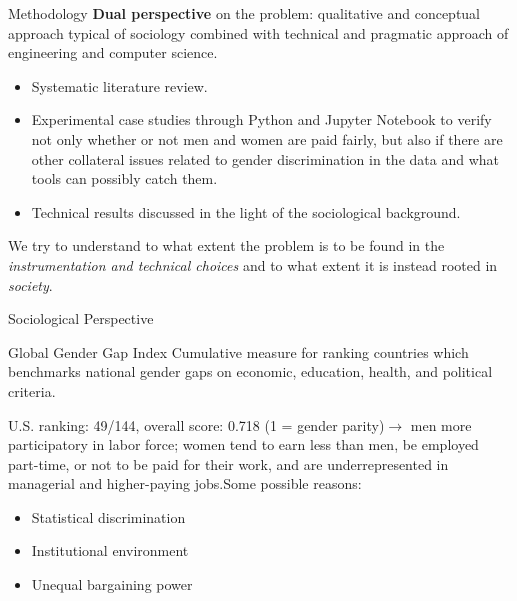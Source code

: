 \documentclass[usenames,dvipsnames]{beamer}
\begin{document}
    
    \begin{frame}{Methodology}
        \textbf{Dual perspective} on the problem: qualitative and conceptual approach typical of sociology combined with technical and pragmatic approach of engineering and computer science.
        	\begin{itemize}
        	    \item Systematic literature review.
        	    \item Experimental case studies through Python and Jupyter Notebook to verify not only whether or not men and women are paid fairly, but also if there are other collateral issues related to gender discrimination in the data and what tools can possibly catch them.
        	    \item Technical results discussed in the light of the sociological background.
        	\end{itemize}
        	 We try to understand to what extent the problem is to be found in the \textit{instrumentation and technical choices} and to what extent it is instead rooted in \textit{society}.
    \end{frame}
    
    
    \begin{frame}{Sociological Perspective}
        \begin{block}{Global Gender Gap Index}
            Cumulative measure for ranking countries which benchmarks national gender gaps on economic, education, health, and political criteria.
        \end{block}
        U.S. ranking: 49/144, overall score: 0.718 (1 = gender parity)\newline $\rightarrow$ men more participatory in labor force; women tend to earn less than men, be employed part-time, or not to be paid for their work, and are underrepresented in managerial and higher-paying jobs.\newline\newline Some possible reasons:
        \begin{itemize}
            \item Statistical discrimination \emph{\parencite{tilcsik2021statistical}}
            \item Institutional environment \emph{\parencite{beggs1995institutional}}
            \item Unequal bargaining power \emph{\parencite{folbre2021gender}}
        \end{itemize}
    \end{frame}
    
\end{document}
